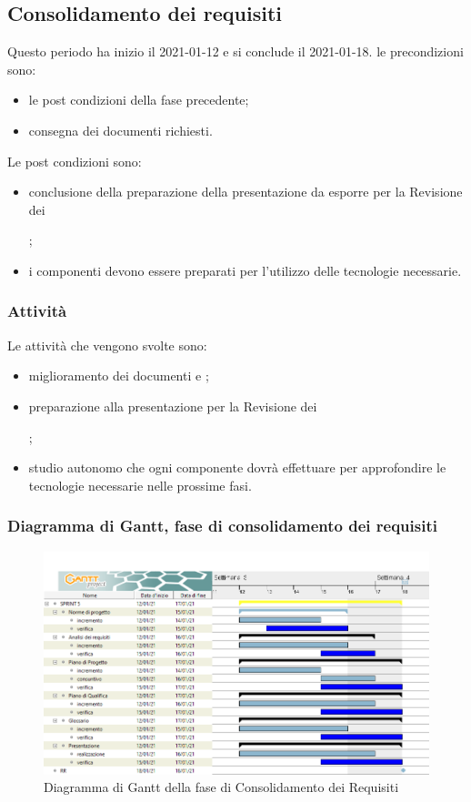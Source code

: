 \subsection{Consolidamento dei requisiti}
Questo periodo ha inizio il 2021-01-12 e si conclude il 2021-01-18.
le precondizioni sono:
\begin{itemize}
	\item le post condizioni della fase precedente;
	\item consegna dei documenti richiesti.
\end{itemize}
Le post condizioni sono:
\begin{itemize}
	\item conclusione della preparazione della presentazione da esporre per la Revisione dei ;
	\item i componenti devono essere preparati per l'utilizzo delle tecnologie necessarie.
\end{itemize}
\subsubsection{Attività}
Le attività che vengono svolte sono:
\begin{itemize}
	\item miglioramento dei documenti e ;
	\item preparazione alla presentazione per la Revisione dei ;
	\item studio autonomo che ogni componente dovrà effettuare per approfondire le tecnologie necessarie nelle prossime fasi.
\end{itemize}
\subsubsection{Diagramma di Gantt, fase di consolidamento dei requisiti}
\begin{figure}[H]
    \centering
    \includegraphics[scale = 0.4]{components/img/consolidamento_requisiti.png}
    \caption{Diagramma di Gantt della fase di Consolidamento dei Requisiti}
    \label{fig:Diagramma di Gantt, fase di consolidamento dei requisiti}
\end{figure}

